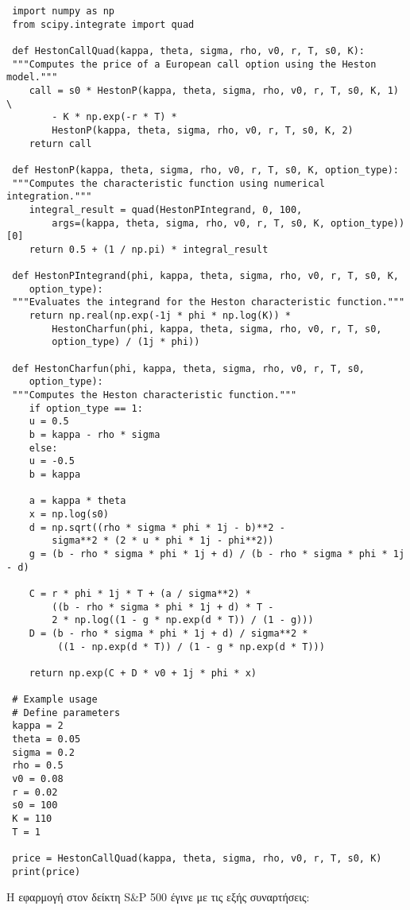 \documentclass[12pt,a4paper,twoside,openany]{book}
\begin{document}
 \begin{lstlisting}
 import numpy as np
 from scipy.integrate import quad
 
 def HestonCallQuad(kappa, theta, sigma, rho, v0, r, T, s0, K):
 """Computes the price of a European call option using the Heston model."""
 	call = s0 * HestonP(kappa, theta, sigma, rho, v0, r, T, s0, K, 1) \
 		- K * np.exp(-r * T) * 
 		HestonP(kappa, theta, sigma, rho, v0, r, T, s0, K, 2)
 	return call
 
 def HestonP(kappa, theta, sigma, rho, v0, r, T, s0, K, option_type):
 """Computes the characteristic function using numerical integration."""
 	integral_result = quad(HestonPIntegrand, 0, 100, 
 		args=(kappa, theta, sigma, rho, v0, r, T, s0, K, option_type))[0]
 	return 0.5 + (1 / np.pi) * integral_result
 
 def HestonPIntegrand(phi, kappa, theta, sigma, rho, v0, r, T, s0, K, 
 	option_type):
 """Evaluates the integrand for the Heston characteristic function."""
 	return np.real(np.exp(-1j * phi * np.log(K)) *
 		HestonCharfun(phi, kappa, theta, sigma, rho, v0, r, T, s0, 
 		option_type) / (1j * phi))
 
 def HestonCharfun(phi, kappa, theta, sigma, rho, v0, r, T, s0, 
 	option_type):
 """Computes the Heston characteristic function."""
 	if option_type == 1:
 	u = 0.5
 	b = kappa - rho * sigma
 	else:
 	u = -0.5
 	b = kappa
 
 	a = kappa * theta
 	x = np.log(s0)
 	d = np.sqrt((rho * sigma * phi * 1j - b)**2 - 
 		sigma**2 * (2 * u * phi * 1j - phi**2))
 	g = (b - rho * sigma * phi * 1j + d) / (b - rho * sigma * phi * 1j - d)
 
 	C = r * phi * 1j * T + (a / sigma**2) * 
 		((b - rho * sigma * phi * 1j + d) * T -
 		2 * np.log((1 - g * np.exp(d * T)) / (1 - g)))
 	D = (b - rho * sigma * phi * 1j + d) / sigma**2 *
 		 ((1 - np.exp(d * T)) / (1 - g * np.exp(d * T)))
 
 	return np.exp(C + D * v0 + 1j * phi * x)
 	
 # Example usage
 # Define parameters
 kappa = 2
 theta = 0.05
 sigma = 0.2
 rho = 0.5
 v0 = 0.08
 r = 0.02
 s0 = 100
 K = 110
 T = 1

 price = HestonCallQuad(kappa, theta, sigma, rho, v0, r, T, s0, K)
 print(price)\end{lstlisting}
 	\vspace{4mm}
 	Η εφαρμογή στον δείκτη S\&P 500 έγινε με τις εξής συναρτήσεις:
 	\selectlanguage{english}
\end{document}
